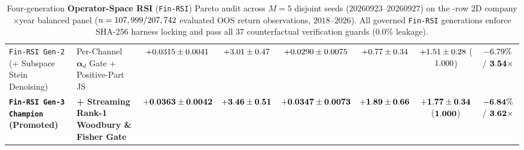 \begin{table}[t]
{\begin{tabular}{llcccccc}
\texttt{Fin-RSI Gen-2} (+ Subspace Stein Denoising) & Per-Channel $\boldsymbol{\alpha}_d$ Gate + Positive-Part JS & $+0.0315{} \pm 0.0041{}$ & $+3.01{} \pm 0.47{}$ & $+0.0290{} \pm 0.0075{}$ & $+0.77{} \pm 0.34{}$ & $+1.51{} \pm 0.28{}$ ($1.000{}$) & $-6.79{}\%$ / $\mathbf{3.54{}\times}$ \\
\textbf{\texttt{Fin-RSI Gen-3 Champion} (Promoted)} & \textbf{+ Streaming Rank-1 Woodbury \& Fisher Gate} & $\mathbf{+0.0363{} \pm 0.0042{}}$ & $\mathbf{+3.46{} \pm 0.51{}}$ & $\mathbf{+0.0347{} \pm 0.0073{}}$ & $\mathbf{+1.89{} \pm 0.66{}}$ & $\mathbf{+1.77{} \pm 0.34{}}$ ($\mathbf{1.000{}}$) & $\mathbf{-6.84{}\%}$ / $\mathbf{3.62{}\times}$ \\
\bottomrule
\end{tabular}%
}
\caption{Four-generation \textbf{Operator-Space RSI} (\texttt{Fin-RSI}) Pareto audit across $M=5$ disjoint seeds ($20260923\text{--}20260927$) on the \PanelBalancedRows{}-row 2D company$\times$year balanced panel ($n = 107,999{} / 207,742{}$ evaluated OOS return observations, $2018\text{--}2026$). All governed \texttt{Fin-RSI} generations enforce SHA-256 harness locking and pass all 37 counterfactual verification guards ($0.0\%$ leakage).}
\label{tab:fin_rsi_pareto_ledger}
\end{table}


